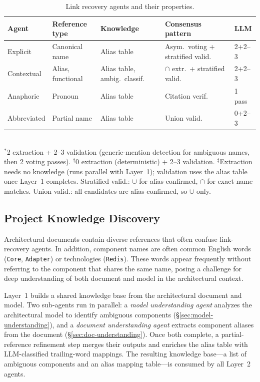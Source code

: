 \begin{table}[t]
\caption{Link recovery agents and their properties.}
\label{tab:strategies}
\centering\footnotesize
\begin{tabular}{@{}lllll@{}}
\toprule
\textbf{Agent} & \textbf{Reference type} & \textbf{Knowledge} & \textbf{Consensus pattern} & \textbf{LLM} \\
\midrule
Explicit & Canonical name & Alias table\rlap{$^\ddagger$} & Asym.\ voting + stratified valid. & 2+2--3\rlap{$^*$} \\
Contextual & Alias, functional & Alias table, ambig.\ classif. & $\cap$ extr.\ + stratified valid. & 2+2--3\rlap{$^*$} \\
Anaphoric & Pronoun & Alias table & Citation verif. & 1 pass \\
Abbreviated & Partial name & Alias table & Union valid. & 0+2--3\rlap{$^\dagger$} \\
\bottomrule
\end{tabular}
\\[2pt]
{\scriptsize $^*$2 extraction + 2--3 validation (generic-mention detection for ambiguous names, then 2 voting passes).
$^\dagger$0 extraction (deterministic) + 2--3 validation.
$^\ddagger$Extraction needs no knowledge (runs parallel with Layer~1);
validation uses the alias table once Layer~1 completes.
Stratified valid.: $\cup$ for alias-confirmed, $\cap$ for exact-name matches.
Union valid.: all candidates are alias-confirmed, so $\cup$ only.}
\end{table}



\subsection{Project Knowledge Discovery}\label{sec:knowledge}

Architectural documents contain diverse references that often confuse
link-recovery agents.
In addition, component names are often common English words
(\texttt{Core}, \texttt{Adapter}) or technologies (\texttt{Redis}).
These words appear frequently without referring to the component that
shares the same name, posing a challenge for deep understanding of
both document and model in the architectural context.

Layer~1 builds a shared knowledge base from the architectural document
and model.
Two sub-agents run in parallel: a \emph{model understanding agent}
analyzes the architectural model to identify ambiguous components
(\S\ref{sec:model-understanding}), and a \emph{document understanding
agent} extracts component aliases from the document
(\S\ref{sec:doc-understanding}).
Once both complete, a partial-reference refinement step merges their
outputs and enriches the alias table with LLM-classified trailing-word
mappings.
The resulting knowledge base---a list of ambiguous components and an
alias mapping table---is consumed by all Layer~2 agents.

